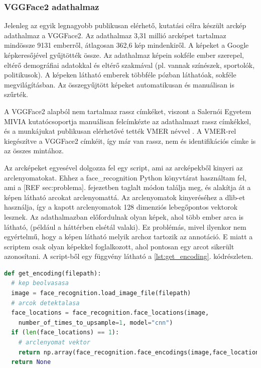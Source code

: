 \subsubsection*{VGGFace2 adathalmaz}

Jelenleg az egyik legnagyobb publikusan elérhető, kutatási célra készült arckép adathalmaz a VGGFace2. Az adathalmaz 3,31 millió arcképet tartalmaz mindössze 9131 emberről, átlagosan 362,6 kép mindenkiről. A képeket a Google képkeresőjével gyűjtötték össze. Az adathalmaz képein sokféle ember szerepel, eltérő demográfiai adatokkal és eltérő szakmával (pl. vannak színészek, sportolók, politikusok). A képeken látható emberek többféle pózban láthatóak, sokféle megvilágításban. Az összegyűjtött képeket automatikusan és manuálisan is szűrték.

A VGGFace2 alapból nem tartalmaz rassz címkéket, viszont a Salernói Egyetem MIVIA kutatócsoportja manuálisan felcímkézte az adathalmazt rassz címkékkel, és a munkájukat publikusan elérhetővé tették VMER névvel \cite{vmer2020}. A VMER-rel kiegészítve a VGGFace2 címkéit, így már van rassz, nem és identifikációs címke is az összes mintához.

Az arcképeket egyesével dolgozza fel egy script, ami az arcképekből kinyeri az arclenyomatokat. Ehhez a face\_recognition Python könyvtárat \cite{face_recognition} használtam fel, ami a [REF sec:problema]. fejezetben taglalt módon találja meg, és alakítja át a képen látható arcokat arclenyomattá. Az arclenyomatok kinyeréséhez a dlib-et \cite{dlib2009} használja, így a kapott arclenyomatok 128 dimenziós lebegőpontos vektorok lesznek. Az adathalmazban előfordulnak olyan képek, ahol több ember arca is látható, (például a háttérben elsétál valaki). Ez problémás, mivel ilyenkor nem egyértelmű, hogy a képen látható melyik archoz tartozik az annotáció. E miatt a scriptem csak olyan képekkel foglalkozott, ahol pontosan egy arcot sikerült azonosítani. A script-ből egy függvény látható a \ref{lst:get_encoding}. kódrészleten.

\begin{lstlisting}[language=python, caption={Arclenyomat vektorok kinyerése.}, label=lst:get_encoding]
def get_encoding(filepath):
  # kep beolvasasa
  image = face_recognition.load_image_file(filepath) 
  # arcok detektalasa 
  face_locations = face_recognition.face_locations(image,
    number_of_times_to_upsample=1, model="cnn")
  if (len(face_locations) == 1): 
    # arclenyomat vektor
    return np.array(face_recognition.face_encodings(image,face_locations))[1]
  return None
\end{lstlisting}


